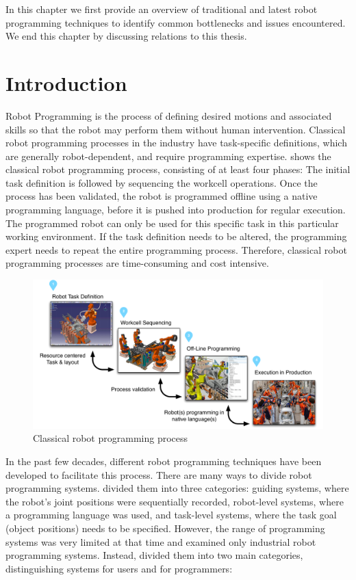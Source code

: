 In this chapter we first provide an overview of traditional and latest robot programming techniques to identify common bottlenecks and issues encountered.
We end this chapter by discussing relations to this thesis.

\section{Introduction}
Robot Programming is the process of defining desired motions and associated skills so that the robot may perform them without human intervention.
Classical robot programming processes in the industry have task-specific definitions, which are generally robot-dependent, and require programming expertise.
 shows the classical robot programming process, consisting of at least four phases:
The initial task definition is followed by sequencing the workcell operations.
Once the process has been validated, the robot is programmed offline using a native programming language, before it is pushed into production for regular execution.
The programmed robot can only be used for this specific task in this particular working environment.
If the task definition needs to be altered, the programming expert needs to repeat the entire programming process.
Therefore, classical robot programming processes are time-consuming and cost intensive.

\begin{figure}[ht]
	\centering
	\includegraphics[width=\linewidth]{figures/manual-programming}
	\caption{Classical robot programming process}
	\label{fig:Classical robot programming process}
\end{figure}

In the past few decades, different robot programming techniques have been developed to facilitate this process. 
There are many ways to divide robot programming systems. 
\cite{lozano1983robot} divided them into three categories: 
guiding systems, where the robot's joint positions were sequentially recorded,
robot-level systems, where a programming language was used, and
task-level systems, where the task goal (\eg object positions) needs to be specified.
However, the range of programming systems was very limited at that time and examined only industrial robot programming systems.
Instead, \cite{Biggs2003} divided them into two main categories, distinguishing systems for users and for programmers:

